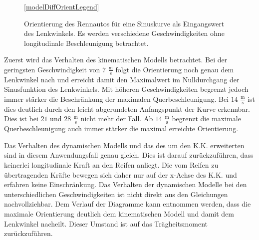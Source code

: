 \documentclass{like}
\begin{document}
\begin{figure}
	\centering
	\subfigure{
		 
	}%
	\subfigure{
		 
	}	
	
	\ref{modelDiffOrientLegend}
	\caption{Orientierung des Rennautos für eine Sinuskurve als Eingangswert des Lenkwinkels. Es werden verschiedene Geschwindigkeiten ohne longitudinale Beschleunigung betrachtet.}\label{fig:modelDiffOrient}
\end{figure}

Zuerst wird das Verhalten des kinematischen Modells betrachtet. Bei der geringsten Geschwindigkeit von $7$ $\frac{\text{m}}{\text{s}}$ folgt die Orientierung noch genau dem Lenkwinkel nach und erreicht damit den Maximalwert im Nulldurchgang der Sinusfunktion des Lenkwinkels. Mit höheren Geschwindigkeiten begrenzt jedoch immer stärker die Beschränkung der maximalen Querbeschleunigung. Bei $14$ $\frac{\text{m}}{\text{s}}$ ist dies deutlich durch den leicht abgerundeten Anfangspunkt der Kurve erkennbar. Dies ist bei $21$ und $28$ $\frac{\text{m}}{\text{s}}$ nicht mehr der Fall. Ab  $14$ $\frac{\text{m}}{\text{s}}$ begrenzt die maximale Querbeschleunigung auch immer stärker die maximal erreichte Orientierung. 

Das Verhalten des dynamischen Modells und das des um den \ac{K.K.} erweiterten sind in diesem Anwendungsfall genau gleich. Dies ist darauf zurückzuführen, dass keinerlei longitudinale Kraft an den Reifen anliegt. Die vom Reifen zu übertragenden Kräfte bewegen sich daher nur auf der x-Achse des \ac{K.K.} und erfahren keine Einschränkung. 
Das Verhalten der dynamischen Modelle bei den unterschiedlichen Geschwindigkeiten ist nicht direkt aus den Gleichungen nachvollziehbar.
Dem Verlauf der Diagramme kann entnommen werden, dass die maximale Orientierung deutlich dem kinematischen Modell und damit dem Lenkwinkel nacheilt. Dieser Umstand ist auf das Trägheitsmoment zurückzuführen.
\end{document}
